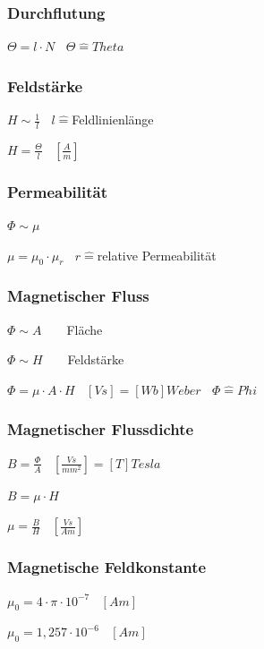 \documentclass[12pt,a4paper]{article}
\begin{document}
\subsubsection{Durchflutung}
$\Theta = l \cdot N~~~~\Theta \widehat{=} Theta$
\subsubsection{Feldstärke}
\begin{description}
\item $H \sim \frac{1}{l}~~~~l \widehat{=} $Feldlinienlänge
\item $H = \frac{\Theta}{l}~~~~[\frac{A}{m}]$
\end{description}
\subsubsection{Permeabilität}
\begin{description}
\item $\Phi \sim \mu$
\item $\mu = \mu_{0} \cdot \mu_{r}~~~~r \widehat{=} $relative Permeabilität
\end{description}
\subsubsection{Magnetischer Fluss}
\begin{description}
\item $\Phi \sim A$~~~~Fläche
\item $\Phi \sim H$~~~~Feldstärke
\item $\Phi = \mu \cdot A \cdot H~~~~[Vs] = [Wb] Weber ~~~~ \Phi \widehat{=} Phi$
\end{description}

\subsubsection{Magnetischer Flussdichte}
\begin{description}
\item $B = \frac{\Phi}{A}~~~~[\frac{Vs}{mm^{2}}]=[T]Tesla$
\item $B = \mu \cdot H$
\item $\mu = \frac{B}{H}~~~~[\frac{Vs}{Am}]$
\end{description}
\subsubsection{Magnetische Feldkonstante}
\begin{description}
\item $\mu_{0} = 4 \cdot  \pi \cdot 10 ^{-7}~~~~[Am]$
\item $\mu_{0} = 1,257 \cdot 10 ^{-6}~~~~[Am]$
\end{description}
\end{document}
